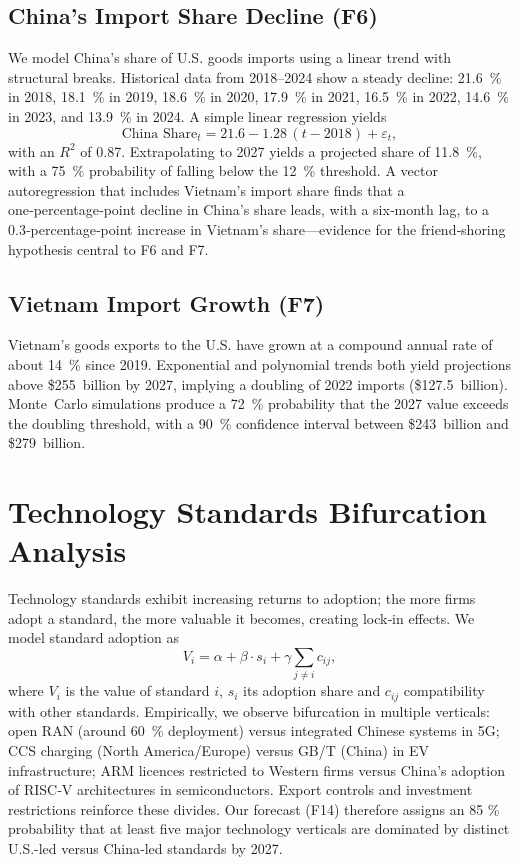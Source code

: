 \documentclass{article}
\begin{document}
\subsection{China’s Import Share Decline (F6)}

We model China’s share of U.S. goods imports using a linear trend with structural breaks.  Historical data from 2018–2024 show a steady decline: 21.6 \% in 2018, 18.1 \% in 2019, 18.6 \% in 2020, 17.9 \% in 2021, 16.5 \% in 2022, 14.6 \% in 2023, and 13.9 \% in 2024.  A simple linear regression yields
\begin{equation}
\text{China Share}_{t} = 21.6 - 1.28\,(t-2018) + \varepsilon_t,
\end{equation}
with an $R^2$ of 0.87.  Extrapolating to 2027 yields a projected share of 11.8 \%, with a 75 \% probability of falling below the 12 \% threshold.  A vector autoregression that includes Vietnam’s import share finds that a one‑percentage‑point decline in China’s share leads, with a six‑month lag, to a 0.3‑percentage‑point increase in Vietnam’s share—evidence for the friend‑shoring hypothesis central to F6 and F7.

\subsection{Vietnam Import Growth (F7)}

Vietnam’s goods exports to the U.S. have grown at a compound annual rate of about 14 \% since 2019.  Exponential and polynomial trends both yield projections above \$255 billion by 2027, implying a doubling of 2022 imports (\$127.5 billion).  Monte Carlo simulations produce a 72 \% probability that the 2027 value exceeds the doubling threshold, with a 90 \% confidence interval between \$243 billion and \$279 billion.

\section{Technology Standards Bifurcation Analysis}

Technology standards exhibit increasing returns to adoption; the more firms adopt a standard, the more valuable it becomes, creating lock‑in effects.  We model standard adoption as
\begin{equation}
V_i = \alpha + \beta \cdot s_i + \gamma \sum_{j \neq i} c_{ij},
\end{equation}
where $V_i$ is the value of standard $i$, $s_i$ its adoption share and $c_{ij}$ compatibility with other standards.  Empirically, we observe bifurcation in multiple verticals: open RAN (around 60 \% deployment) versus integrated Chinese systems in 5G; CCS charging (North America/Europe) versus GB/T (China) in EV infrastructure; ARM licences restricted to Western firms versus China’s adoption of RISC‑V architectures in semiconductors.  Export controls and investment restrictions reinforce these divides.  Our forecast (F14) therefore assigns an 85 \% probability that at least five major technology verticals are dominated by distinct U.S.-led versus China‑led standards by 2027.
\end{document}
